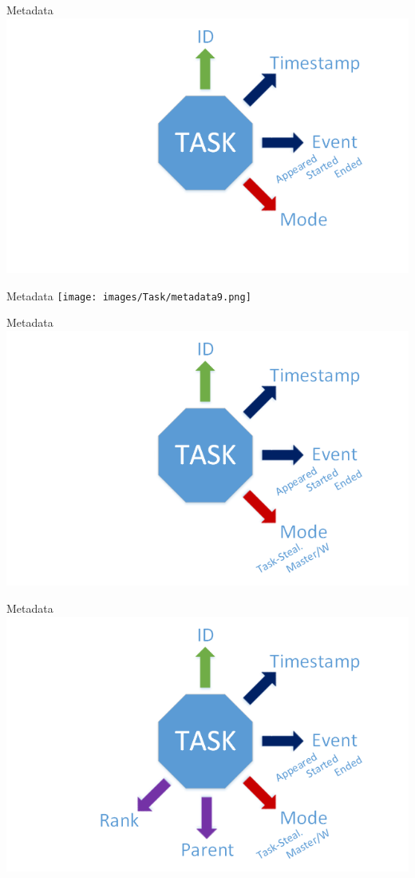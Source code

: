 	\begin{frame}{Metadata}
	\includegraphics[width=1.0\textwidth]{images/Task/metadata8.png}
	\end{frame}
	
	\begin{frame}{Metadata}
	\texttt{[image: images/Task/metadata9.png]}
	\end{frame}
	
	\begin{frame}{Metadata}
	\includegraphics[width=1.0\textwidth]{images/Task/metadata10.png}
	\end{frame}
	
	\begin{frame}{Metadata}
	\includegraphics[width=1.0\textwidth]{images/Task/metadata11.png}
	\end{frame}
	
